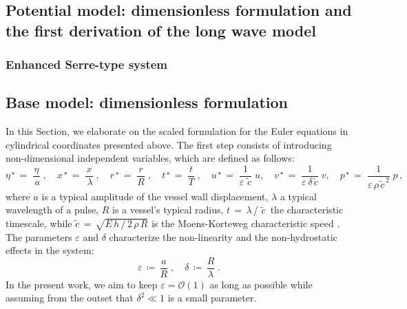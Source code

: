 \documentclass[alpha-refs, 12pt]{wiley-article}
\renewcommand{\O}{\mathcal{O}}
\newcommand{\eps}{\varepsilon}
\begin{document}
\subsection{Potential model: dimensionless formulation and the first derivation of the long wave model}\label{sec:dimless_longwave}



\subsubsection{Enhanced Serre-type system}\label{sec:cbsys}



\subsection{Base model: dimensionless formulation}

In this Section, we elaborate on the scaled formulation for the Euler equations in cylindrical coordinates presented above. The first step consists of introducing non-dimensional independent variables, which are defined as follows:
\begin{equation*}
  \eta^{\,\star}\,=\;\frac{\eta}{\,a}\;,\quad x^{\,\star}\,=\;\frac{x}{\,\lambda}\;,\quad r^{\,\star}\,=\;\frac{r}{R}\;,\quad t^{\,\star}\,=\;\frac{t}{T}\;,\quad u^{\,\star}\,=\;\frac{1}{\eps\, \tilde{\,c}}\;u, \quad v^{\,\star}\,=\;\frac{1}{\eps\,\delta\,\tilde{c}}\;v, \quad p^{\,\star}\,=\;\frac{1}{\eps\,\rho\, \tilde{c}^{\,2}}\;p\,,
\end{equation*}
where $a$ is a typical amplitude of the vessel wall displacement, $\lambda$ a typical wavelength of a pulse, $R$ is a vessel's typical radius, $ t\,=\,\lambda$\,/\,\,$\tilde{c}\,$ the characteristic timescale, while $\tilde{c}\,=\,\sqrt{E\,h\,/\,2\, \rho\,R}$ is the Moens-Korteweg characteristic speed \cite{Fung1997a}. The parameters $\eps$ and $\delta$ characterize the non-linearity and the non-hydrostatic effects in the system:
\begin{equation*}
  \eps\,\coloneqq\, \frac{a}{R}\;, \quad \delta\,\coloneqq\,\frac{R}{\lambda}\;.
\end{equation*}
In the present work, we aim to keep $\eps = \O(1)$ as long as possible while assuming from the outset that $\delta^2 \ll 1$ is a small parameter.
\end{document}
